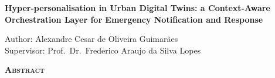 \begin{center}
	{\Large{\textbf{Hyper-personalisation in Urban Digital Twins: a Context-Aware Orchestration Layer for Emergency Notification and Response}}}
\end{center}

\vspace{1cm}

\begin{flushright}
	Author: Alexandre Cesar de Oliveira Guimarães\\
	Supervisor: Prof.\ Dr.\ Frederico Araujo da Silva Lopes
\end{flushright}

\vspace{1cm}

\begin{center}
	\Large{\textsc{\textbf{Abstract}}}
\end{center}


